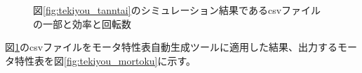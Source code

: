 \begin{figure}[t]
	\centering
	\caption{図\ref{fig:tekiyou_tanntai}のシミュレーション結果であるcsvファイルの一部と効率と回転数}
	\label{fig:tekiyou_csv}
\end{figure}
図\ref{fig:tekiyou_csv}のcsvファイルをモータ特性表自動生成ツールに適用した結果、出力するモータ特性表を図\ref{fig:tekiyou_mortoku}に示す。
